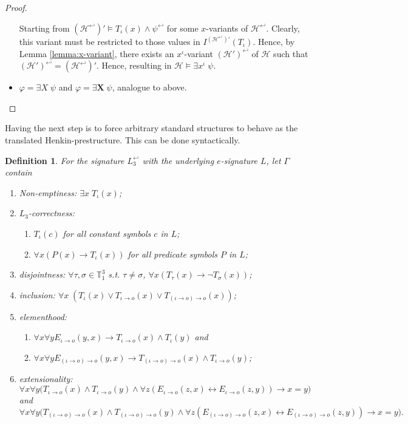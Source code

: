\documentclass[11pt,a4paper]{article}
\newtheorem{mydef}{Definition}
\newcommand{\tofo}{\hookleftarrow}
\newcommand{\of}{\iota }
\newcommand{\os}{\iota \to o}
\newcommand{\ot}{(\iota \to o)\to o}
\begin{document}
\begin{proof}
\begin{itemize}
Starting from $(\mathcal{H}^{\tofo})' \models T_{\of}(x) \land \psi^{\tofo}$ for some $x$-variants of $\mathcal{H}^{\tofo}$. Clearly, this variant must be restricted to those values in $I^{(\mathcal{H}^{\tofo})' }(T_{\of})$. Hence, by Lemma \ref{lemma:x-variant}, there exists an $x^{\of}$-variant $(\mathcal{H}')^{\tofo}$ of $\mathcal{H}$ such that $(\mathcal{H}')^{\tofo} =(\mathcal{H}^{\tofo})'$. Hence, resulting in $\mathcal{H} \models \exists x^{\of} \; \psi$.


\item $\varphi = \exists X \; \psi$ and $\varphi = \exists \mathbf{X} \; \psi$, analogue to above.

\end{itemize}
\end{proof}


Having the next step is to force arbitrary standard structures to behave as the translated Henkin-prestructure. This can be done syntactically.

\begin{mydef}
For the signature $L_3^{\tofo}$ with the underlying $e$-signature $L$, let $\Gamma$ contain
\begin{enumerate}
\item Non-emptiness: $\exists x\;T_{\of}(x)$;
\item $L_3$-correctness: 
\begin{enumerate}
\item $T_{\of}(c)$ for all constant symbols $c$ in $L$;
\item $\forall x (P(x) \to T_{\of}(x))$ for all predicate symbols $P$ in $L$;
\end{enumerate}
\item disjointness: $\forall \tau, \sigma \in \mathbb{T}_1^3$ s.t. $\tau \neq \sigma$, $\forall x (T_{\tau}(x) \to \neg T_{\sigma}(x))$;
\item inclusion: $\forall x \;( T_{\of}(x) \lor T_{\os}(x) \lor T_{\ot}(x))$;
\item elementhood:
\begin{enumerate}
\item  $\forall x\forall y E_{\os}(y,x) \to T_{\os}(x) \land T_{\of}(y)$ and
\item$\forall x\forall y E_{\ot}(y,x) \to T_{\ot}(x) \land T_{\os}(y)$;
\end{enumerate}
\item extensionality: 
\begin{equation*}
\forall x \forall y \big(T_{\os}(x) \land T_{\os}(y)  \land \forall z ( E_{\os}(z,x)  \leftrightarrow  E_{\os}(z,y) ) \to  x = y\big)
\end{equation*}
and
\begin{equation*}
\forall x \forall y \big(T_{\ot}(x) \land T_{\ot}(y)  \land \forall z ( E_{\ot}(z,x)  \leftrightarrow  E_{\ot}(z,y) ) \to  x = y\big).
\end{equation*}
\end{enumerate}
\end{mydef}
\end{document}
